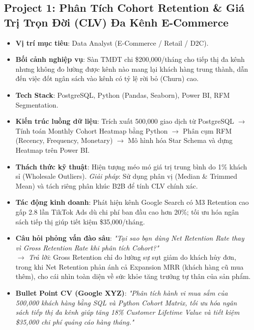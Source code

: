 \subsection{Project 1: Phân Tích Cohort Retention \& Giá Trị Trọn Đời (CLV) Đa Kênh E-Commerce}
\begin{itemize}
    \item \textbf{Vị trí mục tiêu}: Data Analyst (E-Commerce / Retail / D2C).
    \item \textbf{Bối cảnh nghiệp vụ}: Sàn TMĐT chi \$200,000/tháng cho tiếp thị đa kênh nhưng không đo lường được kênh nào mang lại khách hàng trung thành, dẫn đến việc đốt ngân sách vào kênh có tỷ lệ rời bỏ (Churn) cao.
    \item \textbf{Tech Stack}: PostgreSQL, Python (Pandas, Seaborn), Power BI, RFM Segmentation.
    \item \textbf{Kiến trúc luồng dữ liệu}: Trích xuất 500,000 giao dịch từ PostgreSQL $\rightarrow$ Tính toán Monthly Cohort Heatmap bằng Python $\rightarrow$ Phân cụm RFM (Recency, Frequency, Monetary) $\rightarrow$ Mô hình hóa Star Schema và dựng Heatmap trên Power BI.
    \item \textbf{Thách thức kỹ thuật}: Hiện tượng méo mó giá trị trung bình do 1\% khách sỉ (Wholesale Outliers). \textit{Giải pháp}: Sử dụng phân vị (Median \& Trimmed Mean) và tách riêng phân khúc B2B để tính CLV chính xác.
    \item \textbf{Tác động kinh doanh}: Phát hiện kênh Google Search có M3 Retention cao gấp 2.8 lần TikTok Ads dù chi phí ban đầu cao hơn 20\%; tối ưu hóa ngân sách tiếp thị giúp tiết kiệm \$35,000/tháng.
    \item \textbf{Câu hỏi phỏng vấn đào sâu}: \textit{"Tại sao bạn dùng Net Retention Rate thay vì Gross Retention Rate khi phân tích Cohort?"} \\
    $\rightarrow$ \textit{Trả lời}: Gross Retention chỉ đo lường sự sụt giảm do khách hủy đơn, trong khi Net Retention phản ánh cả Expansion MRR (khách hàng cũ mua thêm), cho cái nhìn toàn diện về sức khỏe tăng trưởng tự thân của sản phẩm.
    \item \textbf{Bullet Point CV (Google XYZ)}: \textit{"Phân tích hành vi mua sắm của 500,000 khách hàng bằng SQL và Python Cohort Matrix, tối ưu hóa ngân sách tiếp thị đa kênh giúp tăng 18\% Customer Lifetime Value và tiết kiệm \$35,000 chi phí quảng cáo hàng tháng."}
\end{itemize}

